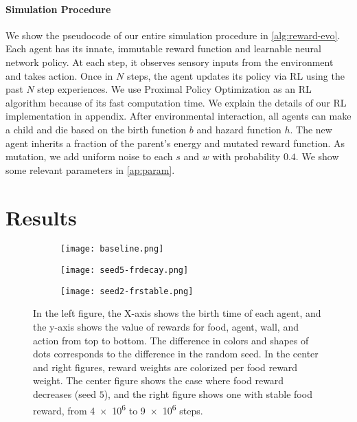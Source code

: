 \paragraph{Simulation Procedure}
We show the pseudocode of our entire simulation procedure in \cref{alg:reward-evo}. Each agent has its innate, immutable reward function and learnable neural network policy. At each step, it observes sensory inputs from the environment and takes action. Once in $N$ steps, the agent updates its policy via RL using the past $N$ step experiences. We use Proximal Policy Optimization \citep{schulmanProximalPolicyOptimization2017} as an RL algorithm because of its fast computation time. We explain the details of our RL implementation in appendix. After environmental interaction, all agents can make a child and die based on the birth function $b$ and hazard function $h$. The new agent inherits a fraction of the parent's energy and mutated reward function. As mutation, we add uniform noise to each $s$ and $w$ with probability $0.4$. We show some relevant parameters in \cref{ap:param}.

\section{Results}

\begin{figure}[t]
  \begin{subfigure}[t]{5cm}
    \centering
    \texttt{[image: baseline.png]}
    \label{subfigure:bl}
  \end{subfigure}
  \begin{subfigure}[t]{5cm}
    \centering
    \texttt{[image: seed5-frdecay.png]}
    \label{subfigure:s5}
  \end{subfigure}
  \begin{subfigure}[t]{5cm}
    \centering
    \texttt{[image: seed2-frstable.png]}
    \label{subfigure:s2}
  \end{subfigure}
  \caption{
    In the left figure, the X-axis shows the birth time of each agent, and the y-axis shows the value of rewards for food, agent, wall, and action from top to bottom. The difference in colors and shapes of dots corresponds to the difference in the random seed. In the center and right figures, reward weights are colorized per food reward weight. The center figure shows the case where food reward decreases (seed $5$), and the right figure shows one with stable food reward,  from \num{4e6} to \num{9e6} steps.
  }\label{figure:baseline-result}
\end{figure}

